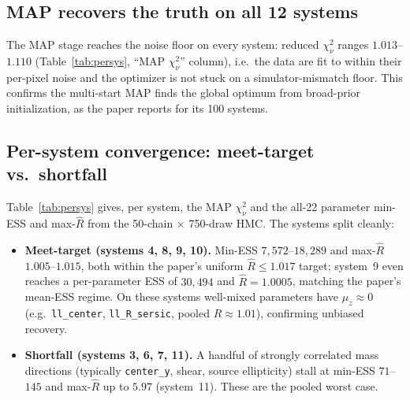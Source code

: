 \documentclass[11pt,letterpaper]{article}
\newcommand{\Rhat}{\ensuremath{\hat{R}}}
\newcommand{\chisq}{\ensuremath{\chi^2_\nu}}
\newcommand{\muz}{\ensuremath{\mu_z}}
\begin{document}
\subsection{MAP recovers the truth on all 12 systems}

The MAP stage reaches the noise floor on every system: reduced $\chisq$
ranges $1.013$--$1.110$ (Table~\ref{tab:persys}, ``MAP $\chisq$'' column),
i.e.\ the data are fit to within their per-pixel noise and the optimizer is
not stuck on a simulator-mismatch floor. This confirms the multi-start MAP
finds the global optimum from broad-prior initialization, as the paper
reports for its 100 systems.

\subsection{Per-system convergence: meet-target vs.\ shortfall}

Table~\ref{tab:persys} gives, per system, the MAP $\chisq$ and the all-22
parameter min-ESS and max-$\Rhat$ from the 50-chain $\times$ 750-draw HMC.
The systems split cleanly:

\begin{itemize}
\item \textbf{Meet-target (systems 4, 8, 9, 10).} Min-ESS
      $7{,}572$--$18{,}289$ and max-$\Rhat$ $1.005$--$1.015$, both within the
      paper's uniform $\Rhat\le1.017$ target; system~9 even reaches a
      per-parameter ESS of $30{,}494$ and $\Rhat=1.0005$, matching the
      paper's mean-ESS regime. On these systems well-mixed parameters have
      $\muz\approx0$ (e.g.\ \texttt{ll\_center}, \texttt{ll\_R\_sersic},
      pooled $\Rhat\approx1.01$), confirming unbiased recovery.
\item \textbf{Shortfall (systems 3, 6, 7, 11).} A handful of strongly
      correlated mass directions (typically \texttt{center\_y},
      shear, source ellipticity) stall at min-ESS $71$--$145$ and
      max-$\Rhat$ up to $5.97$ (system~11). These are the pooled worst case.
\end{itemize}
\end{document}
